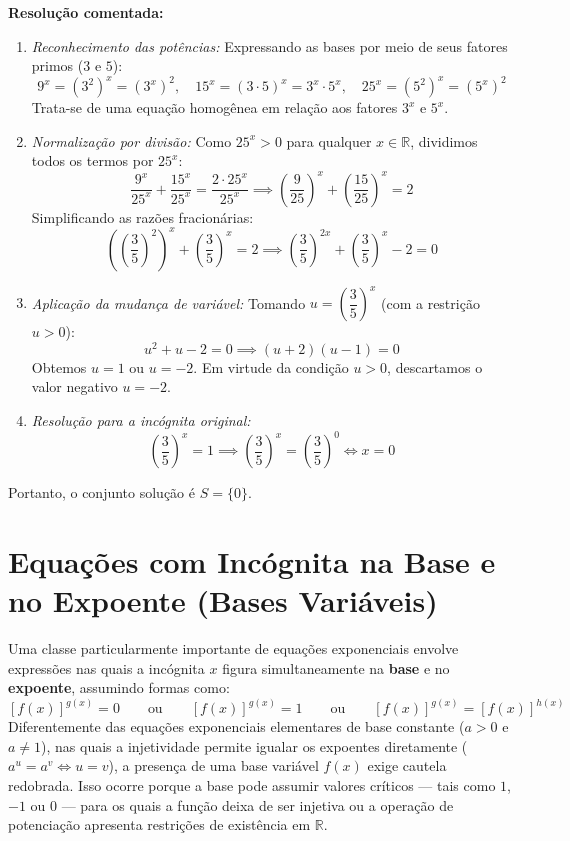 \documentclass[12pt,a4paper]{report}
\begin{document}
	\textbf{Resolução comentada:}
	\begin{enumerate}[label=\alph*)]
		\item \textit{Reconhecimento das potências:}
		Expressando as bases por meio de seus fatores primos ($3$ e $5$):
		\[
		9^x = (3^2)^x = (3^x)^2, \quad 15^x = (3 \cdot 5)^x = 3^x \cdot 5^x, \quad 25^x = (5^2)^x = (5^x)^2
		\]
		Trata-se de uma equação homogênea em relação aos fatores $3^x$ e $5^x$.
		\item \textit{Normalização por divisão:}
		Como $25^x > 0$ para qualquer $x \in \mathbb{R}$, dividimos todos os termos por $25^x$:
		\[
		\frac{9^x}{25^x} + \frac{15^x}{25^x} = \frac{2 \cdot 25^x}{25^x} \implies \left(\frac{9}{25}\right)^x + \left(\frac{15}{25}\right)^x = 2
		\]
		Simplificando as razões fracionárias:
		\[
		\left(\left(\frac{3}{5}\right)^2\right)^x + \left(\frac{3}{5}\right)^x = 2 \implies \left(\frac{3}{5}\right)^{2x} + \left(\frac{3}{5}\right)^x - 2 = 0
		\]
		\item \textit{Aplicação da mudança de variável:}
		Tomando $u = \left(\dfrac{3}{5}\right)^x$ (com a restrição $u > 0$):
		\[
		u^2 + u - 2 = 0 \implies (u + 2)(u - 1) = 0
		\]
		Obtemos $u = 1$ ou $u = -2$. Em virtude da condição $u > 0$, descartamos o valor negativo $u = -2$.
		\item \textit{Resolução para a incógnita original:}
		\[
		\left(\frac{3}{5}\right)^x = 1 \implies \left(\frac{3}{5}\right)^x = \left(\frac{3}{5}\right)^0 \iff x = 0
		\]
	\end{enumerate}
	Portanto, o conjunto solução é $S = \{0\}$.
	
	\section{Equações com Incógnita na Base e no Expoente (Bases Variáveis)}
	\label{subsec:base_expoente_variaveis}
	
	Uma classe particularmente importante de equações exponenciais envolve expressões nas quais a incógnita $x$ figura simultaneamente na \textbf{base} e no \textbf{expoente}, assumindo formas como:
	\[
	[f(x)]^{g(x)} = 0  \qquad \text{ou} \qquad [f(x)]^{g(x)} = 1 \qquad \text{ou} \qquad  [f(x)]^{g(x)} = [f(x)]^{h(x)}
	\]
	Diferentemente das equações exponenciais elementares de base constante ($a > 0$ e $a \neq 1$), nas quais a injetividade permite igualar os expoentes diretamente ($a^u = a^v \iff u = v$), a presença de uma base variável $f(x)$ exige cautela redobrada. Isso ocorre porque a base pode assumir valores críticos — tais como $1$, $-1$ ou $0$ — para os quais a função deixa de ser injetiva ou a operação de potenciação apresenta restrições de existência em $\mathbb{R}$.
	
\end{document}
